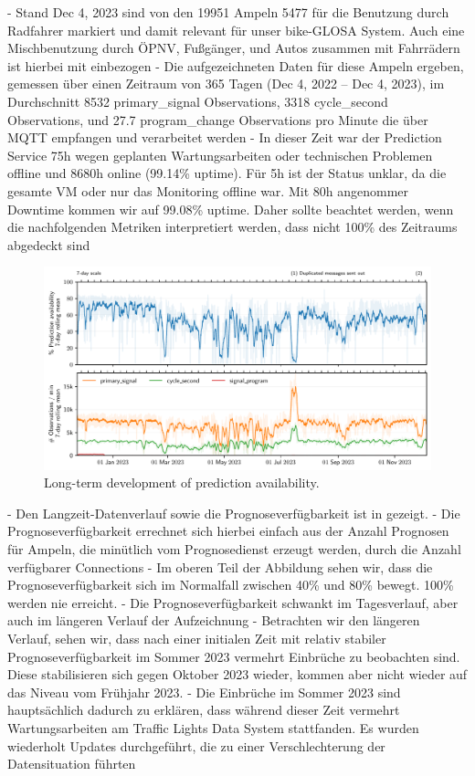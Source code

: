- Stand Dec 4, 2023 sind von den 19951 Ampeln 5477 für die Benutzung durch Radfahrer markiert und damit relevant für unser bike-GLOSA System. Auch eine Mischbenutzung durch ÖPNV, Fußgänger, und Autos zusammen mit Fahrrädern ist hierbei mit einbezogen
- Die aufgezeichneten Daten für diese Ampeln ergeben, gemessen über einen Zeitraum von 365 Tagen (Dec 4, 2022 -- Dec 4, 2023), im Durchschnitt 8532 primary\_signal Observations, 3318 cycle\_second Observations, und 27.7 program\_change Observations pro Minute die über MQTT empfangen und verarbeitet werden
- In dieser Zeit war der Prediction Service 75h wegen geplanten Wartungsarbeiten oder technischen Problemen offline und 8680h online (99.14\% uptime). Für 5h ist der Status unklar, da die gesamte VM oder nur das Monitoring offline war. Mit 80h angenommer Downtime kommen wir auf 99.08\% uptime. Daher sollte beachtet werden, wenn die nachfolgenden Metriken interpretiert werden, dass nicht 100\% des Zeitraums abgedeckt sind

\begin{figure}[t]
    \centering
    \includegraphics[width=\linewidth]{images/monitoring-availability.pdf}
    \caption{Long-term development of prediction availability.}\label{fig:monitoring-availability}
\end{figure}

- Den Langzeit-Datenverlauf sowie die Prognoseverfügbarkeit ist in   gezeigt.
- Die Prognoseverfügbarkeit errechnet sich hierbei einfach aus der Anzahl Prognosen für Ampeln, die minütlich vom Prognosedienst erzeugt werden, durch die Anzahl verfügbarer Connections
- Im oberen Teil der Abbildung sehen wir, dass die Prognoseverfügbarkeit sich im Normalfall zwischen 40\% und 80\% bewegt. 100\% werden nie erreicht.
- Die Prognoseverfügbarkeit schwankt im Tagesverlauf, aber auch im längeren Verlauf der Aufzeichnung
- Betrachten wir den längeren Verlauf, sehen wir, dass nach einer initialen Zeit mit relativ stabiler Prognoseverfügbarkeit im Sommer 2023 vermehrt Einbrüche zu beobachten sind. Diese stabilisieren sich gegen Oktober 2023 wieder, kommen aber nicht wieder auf das Niveau vom Frühjahr 2023.
- Die Einbrüche im Sommer 2023 sind hauptsächlich dadurch zu erklären, dass während dieser Zeit vermehrt Wartungsarbeiten am Traffic Lights Data System stattfanden. Es wurden wiederholt Updates durchgeführt, die zu einer Verschlechterung der Datensituation führten

